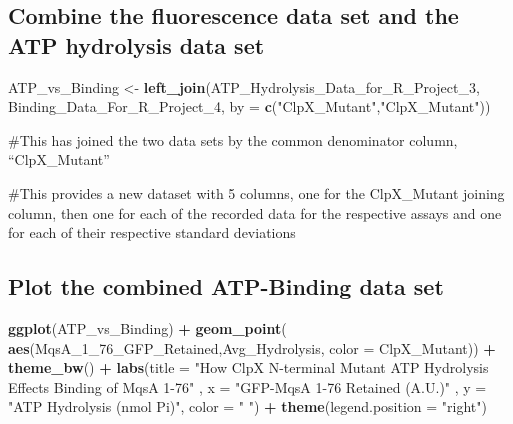 \documentclass[]{article}
\newenvironment{Shaded}{\begin{snugshade}}{\end{snugshade}}
\newcommand{\DataTypeTok}[1]{\textcolor[rgb]{0.13,0.29,0.53}{#1}}
\newcommand{\DecValTok}[1]{\textcolor[rgb]{0.00,0.00,0.81}{#1}}
\newcommand{\KeywordTok}[1]{\textcolor[rgb]{0.13,0.29,0.53}{\textbf{#1}}}
\newcommand{\NormalTok}[1]{#1}
\newcommand{\OperatorTok}[1]{\textcolor[rgb]{0.81,0.36,0.00}{\textbf{#1}}}
\newcommand{\StringTok}[1]{\textcolor[rgb]{0.31,0.60,0.02}{#1}}
\begin{document}
\hypertarget{combine-the-fluorescence-data-set-and-the-atp-hydrolysis-data-set}{%
\subsection{Combine the fluorescence data set and the ATP hydrolysis
data
set}\label{combine-the-fluorescence-data-set-and-the-atp-hydrolysis-data-set}}

\begin{Shaded}
\begin{Highlighting}[]
\NormalTok{ATP_vs_Binding <-}\StringTok{ }\KeywordTok{left_join}\NormalTok{(ATP_Hydrolysis_Data_for_R_Project_}\DecValTok{3}\NormalTok{, Binding_Data_For_R_Project_}\DecValTok{4}\NormalTok{,}
                            \DataTypeTok{by =} \KeywordTok{c}\NormalTok{(}\StringTok{"ClpX_Mutant"}\NormalTok{,}\StringTok{"ClpX_Mutant"}\NormalTok{))}
\end{Highlighting}
\end{Shaded}

\#This has joined the two data sets by the common denominator column,
``ClpX\_Mutant''

\#This provides a new dataset with 5 columns, one for the ClpX\_Mutant
joining column, then one for each of the recorded data for the
respective assays and one for each of their respective standard
deviations

\hypertarget{plot-the-combined-atp-binding-data-set}{%
\subsection{Plot the combined ATP-Binding data
set}\label{plot-the-combined-atp-binding-data-set}}

\begin{Shaded}
\begin{Highlighting}[]
\KeywordTok{ggplot}\NormalTok{(ATP_vs_Binding) }\OperatorTok{+}\StringTok{ }
\StringTok{  }\KeywordTok{geom_point}\NormalTok{( }\KeywordTok{aes}\NormalTok{(MqsA_}\DecValTok{1}\NormalTok{_}\DecValTok{76}\NormalTok{_GFP_Retained,Avg_Hydrolysis, }\DataTypeTok{color =}\NormalTok{ ClpX_Mutant)) }\OperatorTok{+}
\StringTok{  }\KeywordTok{theme_bw}\NormalTok{() }\OperatorTok{+}\StringTok{ }
\StringTok{  }\KeywordTok{labs}\NormalTok{(}\DataTypeTok{title =} \StringTok{"How ClpX N-terminal Mutant ATP Hydrolysis Effects Binding of MqsA 1-76"}\NormalTok{ , }
       \DataTypeTok{x =} \StringTok{"GFP-MqsA 1-76 Retained (A.U.)"}\NormalTok{ , }\DataTypeTok{y =} \StringTok{"ATP Hydrolysis (nmol Pi)"}\NormalTok{, }\DataTypeTok{color =} \StringTok{" "}\NormalTok{) }\OperatorTok{+}
\StringTok{  }\KeywordTok{theme}\NormalTok{(}\DataTypeTok{legend.position =} \StringTok{"right"}\NormalTok{)}
\end{Highlighting}
\end{Shaded}
\end{document}
